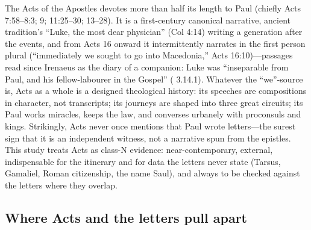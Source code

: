 The Acts of the Apostles devotes more than half its length to Paul
(chiefly Acts 7:58--8:3; 9; 11:25--30; 13--28). It is a first-century
canonical narrative, ancient tradition's ``Luke, the most dear physician''
(Col 4:14) writing a generation after the events, and from Acts 16 onward
it intermittently narrates in the first person plural (``immediately we
sought to go into Macedonia,'' Acts 16:10)---passages read since Irenaeus
as the diary of a companion: Luke was ``inseparable from Paul, and his
fellow-labourer in the Gospel'' ( 3.14.1). Whatever
the ``we''-source is, Acts as a whole is a designed theological history:
its speeches are compositions in character, not transcripts; its journeys
are shaped into three great circuits; its Paul works miracles, keeps the
law, and converses urbanely with proconsuls and kings. Strikingly, Acts
never once mentions that Paul wrote letters---the surest sign that it is
an independent witness, not a narrative spun from the epistles. This study
treats Acts as class-N evidence: near-contemporary, external, indispensable
for the itinerary and for data the letters never state (Tarsus, Gamaliel,
Roman citizenship, the name Saul), and always to be checked against the
letters where they overlap.

\subsection{Where Acts and the letters pull apart}

